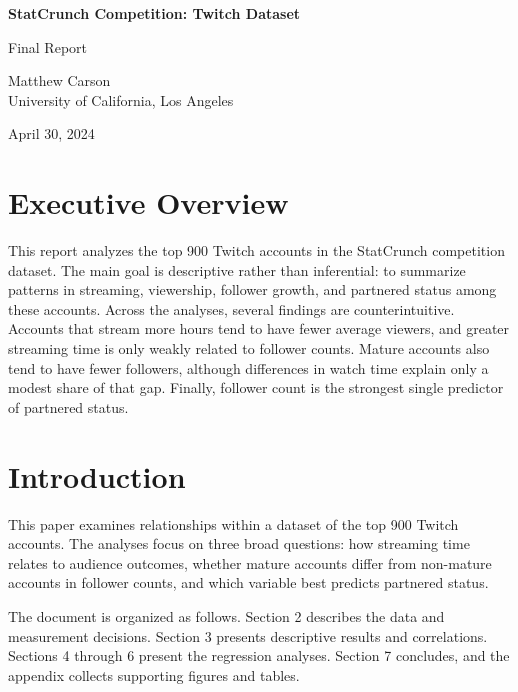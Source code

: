 \documentclass[11pt]{article}
\newcommand{\reporttitle}{StatCrunch Competition: Twitch Dataset}
\newcommand{\reportauthor}{Matthew Carson\\University of California, Los Angeles}
\newcommand{\reportdate}{April 30, 2024}
\begin{document}
\begin{titlepage}
    \centering
    \vspace*{2.5cm}
    {\LARGE \bfseries \reporttitle\par}
    \vspace{1.5cm}
    {\large Final Report\par}
    \vspace{2cm}
    {\large \reportauthor\par}
    \vfill
    {\large \reportdate\par}
\end{titlepage}


\section*{Executive Overview}
This report analyzes the top 900 Twitch accounts in the StatCrunch competition dataset. The main goal is descriptive rather than inferential: to summarize patterns in streaming, viewership, follower growth, and partnered status among these accounts. Across the analyses, several findings are counterintuitive. Accounts that stream more hours tend to have fewer average viewers, and greater streaming time is only weakly related to follower counts. Mature accounts also tend to have fewer followers, although differences in watch time explain only a modest share of that gap. Finally, follower count is the strongest single predictor of partnered status.

\tableofcontents
\listoftables
\listoffigures
\newpage


\section{Introduction}
This paper examines relationships within a dataset of the top 900 Twitch accounts. The analyses focus on three broad questions: how streaming time relates to audience outcomes, whether mature accounts differ from non-mature accounts in follower counts, and which variable best predicts partnered status.

The document is organized as follows. Section 2 describes the data and measurement decisions. Section 3 presents descriptive results and correlations. Sections 4 through 6 present the regression analyses. Section 7 concludes, and the appendix collects supporting figures and tables.
\end{document}
